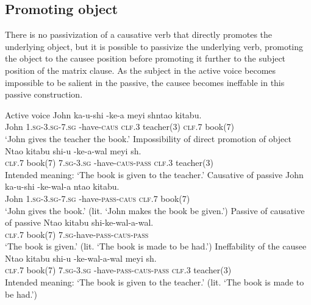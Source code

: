 \documentclass[12pt, oneside]{article}
\begin{document}
\subsection{Promoting object}

There is no passivization of a causative verb that directly promotes the underlying object, but it is possible to passivize the underlying verb, promoting the object to the causee position before promoting it further to the subject position of the matrix clause. As the subject in the active voice becomes impossible to be salient in the passive, the causee becomes ineffable in this passive construction.

\begin{exe}
\ex
\begin{xlist}
\ex Active voice
\gll John ka-u-shi -ke-\textbeltl a meyi sh\textramshorns nta\textbeltl o kitabu. \\
John \textsc{1.sg}-\textsc{3.sg}-\textsc{7.sg} -have-\textsc{caus} \textsc{clf.3} teacher(3) \textsc{clf.7} book(7) \\
\trans `John gives the teacher the book.'
\ex Impossibility of direct promotion of object
\gll * Nta\textbeltl o kitabu shi-u {-ke-\textbeltl a-wal\textramshorns} meyi sh\textramshorns. \\
{} \textsc{clf.7} book(7) \textsc{7.sg}-\textsc{3.sg} -have-\textsc{caus}-\textsc{pass} \textsc{clf.3} teacher(3) \\
\trans Intended meaning: `The book is given to the teacher.'
\ex Causative of passive
\gll John ka-u-shi -ke-wal\textramshorns-\textbeltl a nta\textbeltl o kitabu. \\
John \textsc{1.sg}-\textsc{3.sg}-\textsc{7.sg} -have-\textsc{pass}-\textsc{caus} \textsc{clf.7} book(7) \\
\trans `John gives the book.' (lit. `John makes the book be given.')
\ex Passive of causative of passive
\gll Nta\textbeltl o kitabu shi-ke-wal\textramshorns-\textbeltl a-wal\textramshorns. \\
\textsc{clf.7} book(7) \textsc{7.sg}-have-\textsc{pass}-\textsc{caus}-\textsc{pass} \\
\trans `The book is given.' (lit. `The book is made to be had.')
\ex Ineffability of the causee
\gll * Nta\textbeltl o kitabu shi-u {-ke-wal\textramshorns-\textbeltl a-wal\textramshorns} meyi sh\textramshorns. \\
{} \textsc{clf.7} book(7) \textsc{7.sg}-\textsc{3.sg} -have-\textsc{pass}-\textsc{caus}-\textsc{pass} \textsc{clf.3} teacher(3) \\
\trans Intended meaning: `The book is given to the teacher.' (lit. `The book is made to be had.')
\end{xlist}
\end{exe}
\end{document}
